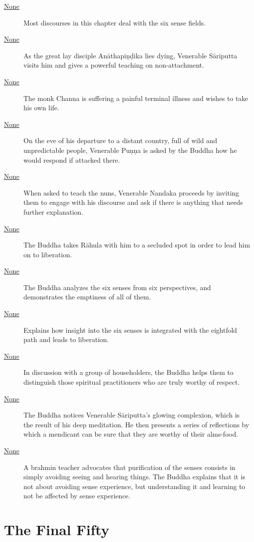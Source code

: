 \documentclass[12pt,openany]{book}%
\let\oldcontentsline\contentsline
\newcommand{\nopagecontentsline}[3]{\oldcontentsline{#1}{#2}{}}
\let\oldmainmatter\mainmatter
\renewcommand{\mainmatter}{%
\chapterfont{\thispagestyle{empty}\vspace*{4em}\setstretch{.85}\LARGE\normalfont\itshape\scshape\centering\MakeLowercase}
\sectionfont{\clearpage\thispagestyle{plain}\vspace*{2em}\setstretch{.85}\normalfont\centering}%
\oldmainmatter}
\begin{document}
\begin{description}
\item[\href{\#mn{-}salayatanavagga}{None}] Most discourses in this chapter deal with the six sense fields.%
\item[\href{\#mn143}{None}] As the great lay disciple \textsanskrit{Anāthapiṇḍika} lies dying, Venerable \textsanskrit{Sāriputta} visits him and gives a powerful teaching on non-attachment.%
\item[\href{\#mn144}{None}] The monk Channa is suffering a painful terminal illness and wishes to take his own life.%
\item[\href{\#mn145}{None}] On the eve of his departure to a distant country, full of wild and unpredictable people, Venerable \textsanskrit{Puṇṇa} is asked by the Buddha how he would respond if attacked there.%
\item[\href{\#mn146}{None}] When asked to teach the nuns, Venerable Nandaka proceeds by inviting them to engage with his discourse and ask if there is anything that needs further explanation.%
\item[\href{\#mn147}{None}] The Buddha takes \textsanskrit{Rāhula} with him to a secluded spot in order to lead him on to liberation.%
\item[\href{\#mn148}{None}] The Buddha analyzes the six senses from six perspectives, and demonstrates the emptiness of all of them.%
\item[\href{\#mn149}{None}] Explains how insight into the six senses is integrated with the eightfold path and leads to liberation.%
\item[\href{\#mn150}{None}] In discussion with a group of householders, the Buddha helps them to distinguish those spiritual practitioners who are truly worthy of respect.%
\item[\href{\#mn151}{None}] The Buddha notices Venerable \textsanskrit{Sāriputta}’s glowing complexion, which is the result of his deep meditation. He then presents a series of reflections by which a mendicant can be sure that they are worthy of their alms-food.%
\item[\href{\#mn152}{None}] A brahmin teacher advocates that purification of the senses consists in simply avoiding seeing and hearing things. The Buddha explains that it is not about avoiding sense experience, but understanding it and learning to not be affected by sense experience.%
\end{description}

%
\mainmatter%
\pagestyle{fancy}%
\part*{The Final Fifty }
\markboth{}{}
\addtocontents{toc}{\let\protect\contentsline\protect\oldcontentsline}
\end{document}
